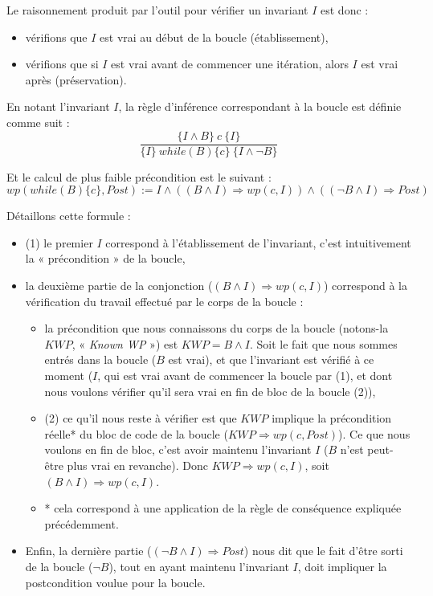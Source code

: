 Le raisonnement produit par l'outil pour vérifier un invariant $I$ est donc :
\begin{itemize}
\item vérifions que $I$ est vrai au début de la boucle (établissement),
\item vérifions que si $I$ est vrai avant de commencer une itération, alors $I$ est vrai après (préservation).
\end{itemize}




En notant l'invariant $I$, la règle d'inférence correspondant à la boucle est
définie comme suit :
$$\dfrac{\{I \wedge B \}\ c\ \{I\}}{\{I\}\ while(B)\{c\}\ \{I \wedge \neg B\}}$$


Et le calcul de plus faible précondition est le suivant :
$$wp(while (B) \{ c \}, Post) := I \wedge ((B \wedge I) \Rightarrow wp(c, I)) \wedge ((\neg B \wedge I) \Rightarrow Post)$$


Détaillons cette formule :



\begin{itemize}
\item (1) le premier $I$ correspond à l'établissement de l'invariant, c'est
intuitivement la « précondition » de la boucle,
\item la deuxième partie de la conjonction ($(B \wedge I) \Rightarrow wp(c, I)$)
correspond à la vérification du travail effectué par le corps de la boucle :
\begin{itemize}
\item la précondition que nous connaissons du corps de la boucle (notons-la $KWP$,
« \textit{Known WP} ») est $KWP = B \wedge I$. Soit le fait que nous sommes
entrés dans la boucle ($B$ est vrai), et que l'invariant est vérifié à ce moment
($I$, qui est vrai avant de commencer la boucle par (1), et dont nous voulons
vérifier qu'il sera vrai en fin de bloc de la boucle (2)),
\item (2) ce qu'il nous reste à vérifier est que $KWP$ implique la
précondition réelle* du bloc de code de la boucle ($KWP \Rightarrow wp(c, Post)$).
Ce que nous voulons en fin de bloc, c'est avoir maintenu l'invariant $I$ ($B$
n'est peut-être plus vrai en revanche). Donc
$KWP \Rightarrow wp(c, I)$, soit $(B \wedge I) \Rightarrow wp(c, I)$.
\item * cela correspond à une application de la règle de conséquence expliquée
précédemment.
\end{itemize}
\item Enfin, la dernière partie ($(\neg B \wedge I) \Rightarrow Post$)
nous dit que le fait d'être sorti de la boucle ($\neg B$), tout en ayant
maintenu l'invariant $I$, doit impliquer la postcondition voulue pour la
boucle.
\end{itemize}


